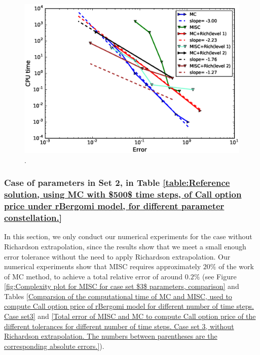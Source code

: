 \begin{figure}[h!]
	\centering
	\includegraphics[width=0.6\linewidth]{./figures/rBergomi_Complexity_rates/set2/error_vs_time_set2_full_comparison}
	
	\caption{.}
	\label{fig:Complexity plot for  MISC for Case set $2$ parameters, comparison}
\end{figure}




\FloatBarrier

\subsubsection{Case of parameters in Set 2, in Table \ref{table:Reference solution, using MC with $500$ time steps, of Call option price under rBergomi model, for different parameter constellation.} }\label{sec:Case of set 3 parameters}

In this section, we only conduct our numerical experiments for the case without Richardson extrapolation, since the results show that we meet a small enough error tolerance without the need to apply   Richardson extrapolation. Our numerical experiments show that MISC requires  approximately $20\%$ of the work of MC method, to achieve  a total relative error of around $0.2\%$ (see Figure \ref{fig:Complexity plot for  MISC for case set $3$ parameters, comparison} and  Tables \ref{Comparsion of the computational time of  MC and MISC, used to compute Call option price of rBergomi model for different number of time steps. Case set3} and \ref{Total error of MISC and MC to compute Call option price of the different tolerances for different number of time steps. Case set 3, without Richardson extrapolation. The numbers between parentheses are the corresponding absolute errors.}).  

